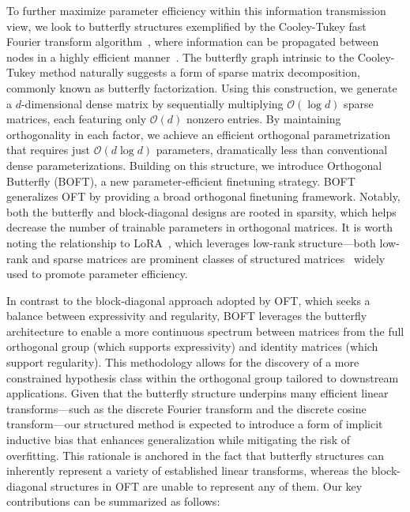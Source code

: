 To further maximize parameter efficiency within this information transmission view, we look to butterfly structures exemplified by the Cooley-Tukey fast Fourier transform algorithm~\cite{cooley1965algorithm}, where information can be propagated between nodes in a highly efficient manner~\cite{klasing1994broadcasting}. The butterfly graph intrinsic to the Cooley-Tukey method naturally suggests a form of sparse matrix decomposition, commonly known as butterfly factorization. Using this construction, we generate a $d$-dimensional dense matrix by sequentially multiplying $\mathcal{O}(\log d)$ sparse matrices, each featuring only $\mathcal{O}(d)$ nonzero entries. By maintaining orthogonality in each factor, we achieve an efficient orthogonal parametrization that requires just $\mathcal{O}(d\log d)$ parameters, dramatically less than conventional dense parameterizations. Building on this structure, we introduce Orthogonal Butterfly (BOFT), a new parameter-efficient finetuning strategy. BOFT generalizes OFT by providing a broad orthogonal finetuning framework. Notably, both the butterfly and block-diagonal designs are rooted in sparsity, which helps decrease the number of trainable parameters in orthogonal matrices. It is worth noting the relationship to LoRA~\cite{hulora2022}, which leverages low-rank structure—both low-rank and sparse matrices are prominent classes of structured matrices~\cite{candes2011robust} widely used to promote parameter efficiency.

In contrast to the block-diagonal approach adopted by OFT, which seeks a balance between expressivity and regularity, BOFT leverages the butterfly architecture to enable a more continuous spectrum between matrices from the full orthogonal group (which supports expressivity) and identity matrices (which support regularity). This methodology allows for the discovery of a more constrained hypothesis class within the orthogonal group tailored to downstream applications. Given that the butterfly structure underpins many efficient linear transforms—such as the discrete Fourier transform and the discrete cosine transform—our structured method is expected to introduce a form of implicit inductive bias that enhances generalization while mitigating the risk of overfitting. This rationale is anchored in the fact that butterfly structures can inherently represent a variety of established linear transforms, whereas the block-diagonal structures in OFT are unable to represent any of them. Our key contributions can be summarized as follows:

